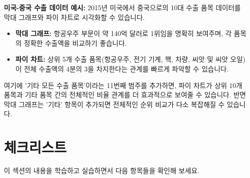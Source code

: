 \documentclass[11pt,a4paper]{book}
\theoremstyle{definition}
\begin{document}
\begin{examplebox}
\textbf{미국-중국 수출 데이터 예시:}
2015년 미국에서 중국으로의 10대 수출 품목 데이터를 막대 그래프와 파이 차트로 시각화할 수 있습니다.
\begin{itemize}
    \item \textbf{막대 그래프:} 항공우주 부문이 약 140억 달러로 1위임을 명확히 보여주며, 각 품목의 정확한 수출액을 비교하기 좋습니다.
    \item \textbf{파이 차트:} 상위 5개 수출 품목(항공우주, 전기 기계, 핵, 차량, 씨앗 및 씨앗 오일)이 전체 수출액의 4분의 3을 차지한다는 관계를 빠르게 파악할 수 있습니다.
\end{itemize}
여기에 '기타 모든 수출 품목'이라는 11번째 범주를 추가하면, 파이 차트가 상위 10개 품목과 기타 품목 간의 전체적인 비율 관계를 더 효과적으로 보여줄 수 있습니다. 반면 막대 그래프는 '기타' 항목이 추가되면 전체적인 순위 비교가 다소 복잡해질 수 있습니다.
\end{examplebox}


\section{체크리스트}

이 섹션의 내용을 학습하고 실습하면서 다음 항목들을 확인해 보세요.
\end{document}
